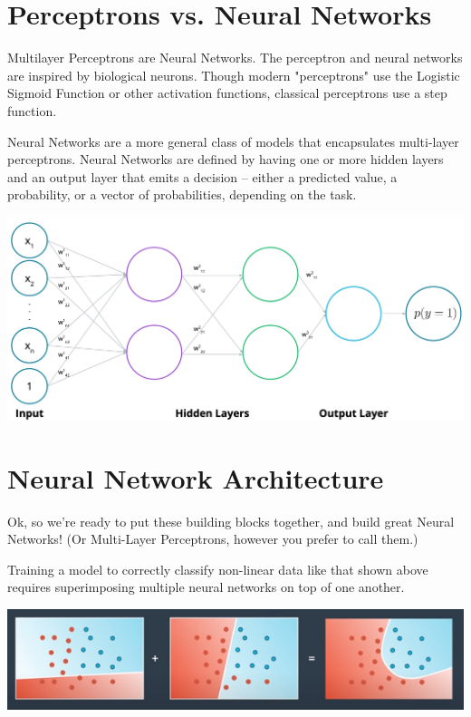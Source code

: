\section{Perceptrons vs. Neural Networks}
Multilayer Perceptrons are Neural Networks. The perceptron and neural networks are inspired by biological neurons. Though modern "perceptrons" use the Logistic Sigmoid Function or other activation functions, classical perceptrons use a step function. \newline

Neural Networks are a more general class of models that encapsulates multi-layer perceptrons. Neural Networks are defined by having one or more hidden layers and an output layer that emits a decision -- either a predicted value, a probability, or a vector of probabilities, depending on the task.

\includegraphics[width=1\linewidth]{img//intro//introNN/screen-shot-2022-05-18-at-8.52.53-am.jpeg}

\section{Neural Network Architecture}
Ok, so we're ready to put these building blocks together, and build great Neural Networks! (Or Multi-Layer Perceptrons, however you prefer to call them.) \newline

Training a model to correctly classify non-linear data like that shown above requires superimposing multiple neural networks on top of one another.

\includegraphics[width=1\linewidth]{img//intro//introNN/neural-network-architecture-2.png}

